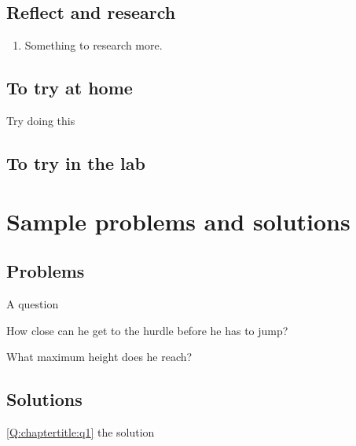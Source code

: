 \subsection{Reflect and research}

\begin{enumerate}
\item Something to research more.
\end{enumerate}
\subsection{To try at home}

\begin{tQuestion}Try doing this \end{tQuestion}

\subsection{To try in the lab}

\newpage
\section{Sample problems and solutions}
\subsection{Problems}
\begin{problemParts}{A question\label{Q:chaptertitle:q1}}
\item How close can he get to the hurdle before he has to jump?
\item What maximum height does he reach?
\end{problemParts}

\newpage
\subsection{Solutions}
\begin{solution}{\ref{Q:chaptertitle:q1}}
{
the solution
}
\end{solution}

